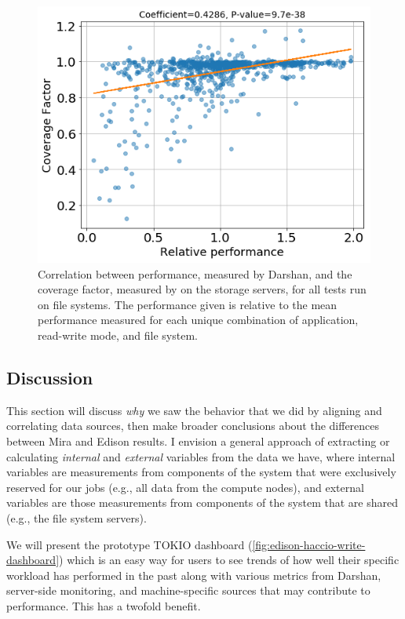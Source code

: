 \documentclass[conference,10pt,compsocconf]{IEEEtran}
\begin{document}
\begin{figure}[t]
\centering
\includegraphics[width=0.8\columnwidth]{figs/edison-perf-vs-fstraffic.png}
\caption{Correlation between performance, measured by Darshan, and the coverage
factor, measured by on the storage servers, for all tests run on file systems.
The performance given is relative to the mean performance measured for each
unique combination of application, read-write mode, and file system.}
\label{fig:correlate-perf-and-fstraffic}
\vspace{-.1in}
\end{figure}


\subsection{Discussion} \label{discussion}

This section will discuss \emph{why} we saw the behavior that we did by
aligning and correlating data sources, then make broader conclusions about the
differences
between Mira and Edison results.  I envision a general approach of extracting
or calculating \emph{internal} and \emph{external} variables from the data we
have, where internal variables are measurements from components of the system
that were exclusively reserved for our jobs (e.g., all data from the compute
nodes), and external variables are those measurements from components of the
system that are shared (e.g., the file system servers).

We will present the prototype TOKIO dashboard (\ref{fig:edison-haccio-write-dashboard})
which is an easy way for users to see trends of how well their specific
workload has performed in the past along with various metrics from Darshan,
server-side monitoring, and machine-specific sources that may contribute to
performance.  This has a twofold benefit.
\end{document}
